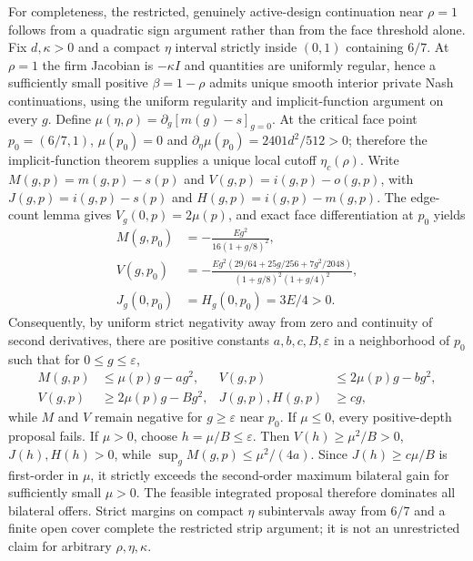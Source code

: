 For completeness, the restricted, genuinely active-design continuation near $\rho=1$ follows from a quadratic sign argument rather than from the face threshold alone. Fix $d,\kappa>0$ and a compact $\eta$ interval strictly inside $(0,1)$ containing $6/7$. At $\rho=1$ the firm Jacobian is $-\kappa I$ and quantities are uniformly regular, hence a sufficiently small positive $\beta=1-\rho$ admits unique smooth interior private Nash continuations, using the uniform regularity and implicit-function argument on every $g$. Define $\mu(\eta,\rho)=\partial_g[m(g)-s]_{g=0}$. At the critical face point $p_0=(6/7,1)$, $\mu(p_0)=0$ and $\partial_\eta\mu(p_0)=2401d^2/512>0$; therefore the implicit-function theorem supplies a unique local cutoff $\eta_c(\rho)$. Write $M(g,p)=m(g,p)-s(p)$ and $V(g,p)=i(g,p)-o(g,p)$, with $J(g,p)=i(g,p)-s(p)$ and $H(g,p)=i(g,p)-m(g,p)$. The edge-count lemma gives $V_g(0,p)=2\mu(p)$, and exact face differentiation at $p_0$ yields
\begin{align*}
M(g,p_0)&=-\frac{Eg^2}{16(1+g/8)^2},\\
V(g,p_0)&=-\frac{Eg^2(29/64+25g/256+7g^2/2048)}{(1+g/8)^2(1+g/4)^2},\\
J_g(0,p_0)&=H_g(0,p_0)=3E/4>0.
\end{align*}
Consequently, by uniform strict negativity away from zero and continuity of second derivatives, there are positive constants $a,b,c,B,\varepsilon$ in a neighborhood of $p_0$ such that for $0\le g\le\varepsilon$,
\begin{equation}\label{eq:quadraticstrip}
\begin{aligned}
M(g,p)&\le\mu(p)g-ag^2, & V(g,p)&\le2\mu(p)g-bg^2,\\
V(g,p)&\ge2\mu(p)g-Bg^2,& J(g,p),H(g,p)&\ge cg,
\end{aligned}
\end{equation}
while $M$ and $V$ remain negative for $g\ge\varepsilon$ near $p_0$. If $\mu\le0$, every positive-depth proposal fails. If $\mu>0$, choose $h=\mu/B\le\varepsilon$. Then $V(h)\ge\mu^2/B>0$, $J(h),H(h)>0$, while $\sup_g M(g,p)\le\mu^2/(4a)$. Since $J(h)\ge c\mu/B$ is first-order in $\mu$, it strictly exceeds the second-order maximum bilateral gain for sufficiently small $\mu>0$. The feasible integrated proposal therefore dominates all bilateral offers. Strict margins on compact $\eta$ subintervals away from $6/7$ and a finite open cover complete the restricted strip argument; it is not an unrestricted claim for arbitrary $\rho,\eta,\kappa$.
